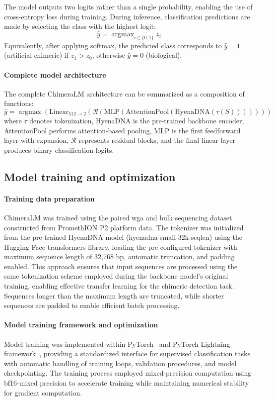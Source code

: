\documentclass[pdflatex,sn-nature]{sn-jnl}%
\DeclareMathOperator*{\argmax}{argmax}
\theoremstyle{thmstyleone}%
\theoremstyle{thmstyletwo}%
\theoremstyle{thmstylethree}%
\begin{document}
The model outputs two logits rather than a single probability, enabling the use of cross-entropy loss during training.
During inference, classification predictions are made by selecting the class with the highest logit:
$$
	\hat{y} = \argmax_{i \in \{0,1\}} z_i
$$
Equivalently, after applying softmax, the predicted class corresponds to $\hat{y} = 1$ (artificial chimeric) if $z_1 > z_0$, otherwise $\hat{y} = 0$ (biological).

\paragraph{Complete model architecture}
The complete ChimeraLM architecture can be summarized as a composition of functions:
$$
	\hat{y} = \argmax(\text{Linear}_{512 \to 2}(\mathcal{R}(\text{MLP}(\text{AttentionPool}(\text{HyenaDNA}(\tau(S)))))))
$$
where $\tau$ denotes tokenization, HyenaDNA is the pre-trained backbone encoder, AttentionPool performs attention-based pooling, MLP is the first feedforward layer with expansion, $\mathcal{R}$ represents residual blocks, and the final linear layer produces binary classification logits.

\subsection*{Model training and optimization}

\paragraph{Training data preparation}
ChimeraLM was trained using the paired \gls{wga} and bulk sequencing dataset constructed from PromethION P2 platform data.
The tokenizer was initialized from the pre-trained HyenaDNA model (hyenadna-small-32k-seqlen) using the Hugging Face transformers library, loading the pre-configured tokenizer with maximum sequence length of 32,768 bp, automatic truncation, and padding enabled.
This approach ensures that input sequences are processed using the same tokenization scheme employed during the backbone model's original training, enabling effective transfer learning for the chimeric detection task.
Sequences longer than the maximum length are truncated, while shorter sequences are padded to enable efficient batch processing.

\paragraph{Model training framework and optimization}
Model training was implemented within PyTorch~\cite{paszke2019pytorch} and PyTorch Lightning framework~\cite{Falcon_PyTorch_Lightning_2019}, providing a standardized interface for supervised classification tasks with automatic handling of training loops, validation procedures, and model checkpointing.
The training process employed mixed-precision computation using bf16-mixed precision to accelerate training while maintaining numerical stability for gradient computation.
\end{document}
